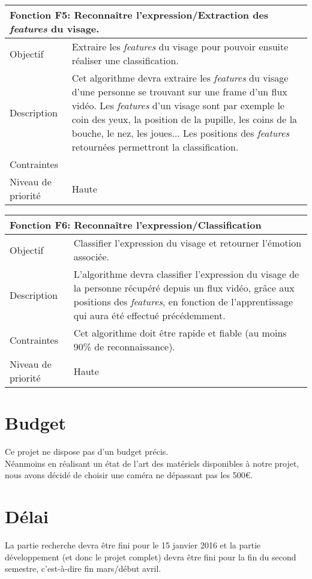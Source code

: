 \documentclass[overfullbox, poster]{polytech/polytech}
\begin{document}
\begin{tabular}{|l|p{12.5cm}|}
   \hline
   \multicolumn{2}{|l|}{\textbf{Fonction F5: Reconnaître l'expression/Extraction des \textit{features} du visage.}} \\
   \hline
   Objectif &Extraire les \textit{features} du visage pour pouvoir ensuite réaliser une classification. \\
   \hline
   Description &Cet algorithme devra extraire les \textit{features} du visage d'une personne se trouvant sur une frame d'un flux vidéo. Les \textit{features} d'un visage sont par exemple le coin des yeux, la position de la pupille, les coins de la bouche, le nez, les joues... Les positions des \textit{features} retournées permettront la classification. \\
   \hline
   Contraintes & \\
   \hline
   Niveau de priorité &Haute \\
   \hline
\end{tabular}

\begin{tabular}{|l|p{12.5cm}|}
   \hline
   \multicolumn{2}{|l|}{\textbf{Fonction F6: Reconnaître l'expression/Classification}} \\
   \hline
   Objectif &Classifier l'expression du visage et retourner l'émotion associée. \\
   \hline
   Description &L'algorithme devra classifier l'expression du visage de la personne récupéré depuis un flux vidéo, grâce aux positions des \textit{features}, en fonction de l'apprentissage qui aura été effectué précédemment. \\
   \hline
   Contraintes &Cet algorithme doit être rapide et fiable (au moins 90\% de reconnaissance). \\
   \hline
   Niveau de priorité &Haute \\
   \hline
\end{tabular}

\section{Budget}
Ce projet ne dispose pas d'un budget précis.\\
Néanmoins en réalisant un état de l'art des matériels disponibles à notre projet, nous avons décidé de choisir une caméra ne dépassant pas les 500€.

\section{Délai}
La partie recherche devra être fini pour le 15 janvier 2016 et la partie développement (et donc le projet complet) devra être fini pour la fin du second semestre, c'est-à-dire fin mars/début avril.
\end{document}
